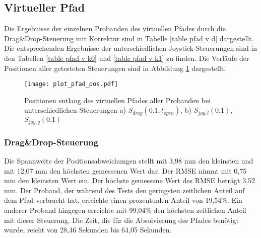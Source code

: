 \subsection{Virtueller Pfad}

Die Ergebnisse der einzelnen Probanden des virtuellen Pfades durch die Drag\&Drop-Steuerung mit Korrektur sind in Tabelle \ref{table pfad v d} dargestellt. Die entsprechenden Ergebnisse der unterschiedlichen Joystick-Steuerungen sind in den Tabellen \ref{table pfad v k0} und \ref{table pfad v k1} zu finden. Die Verläufe der Positionen aller getesteten Steuerungen sind in Abbildung \ref{fig:plot_pfad_pos} dargestellt.

\begin{figure}[H]
	\centering
	\texttt{[image: plot\_pfad\_pos.pdf]}
	\caption[Positionen entlang des virtuellen Pfades aller Probanden]{Positionen entlang des virtuellen Pfades aller Probanden bei unterschiedlichen Steuerungen a) $S_{drag}(0.1,t_{open})$, b) $S_{joy,l}(0.1)$, $S_{joy,q}(0.1)$}
	\label{fig:plot_pfad_pos}
\end{figure}

\subsubsection{Drag\&Drop-Steuerung}
Die Spannweite der Positionsabweichungen stellt mit 3,98 mm den kleinsten und mit 12,07 mm den höchsten gemessenen Wert dar. Der RMSE nimmt mit 0,75 mm den kleinsten Wert ein. Der höchste gemessene Wert des RMSE beträgt 3,52 mm. Der Proband, der während des Tests den geringsten zeitlichen Anteil auf dem Pfad verbracht hat, erreichte einen prozentualen Anteil von 19,54\%. Ein anderer Proband hingegen erreichte mit 99,04\% den höchsten zeitlichen Anteil mit dieser Steuerung. Die Zeit, die für die Absolvierung des Pfades benötigt wurde, reicht von 28,46 Sekunden bis 64,05 Sekunden. 


